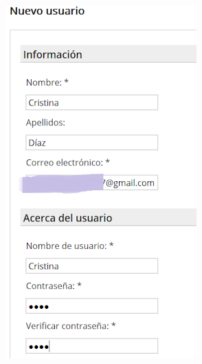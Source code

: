 \documentclass{article}
\begin{document}
\begin{itemize}
\begin{figure}[h!]
\begin{subfigure}[!]{0.25\textwidth}
        \end{subfigure}       
        \begin{subfigure}[!]{0.25\textwidth} 
            \includegraphics[width=\textwidth]{images/cristina.png}
        \end{subfigure}
        \begin{subfigure}[!]{0.25\textwidth} 

\end{subfigure}
\end{figure}
\end{itemize}
\end{document}

